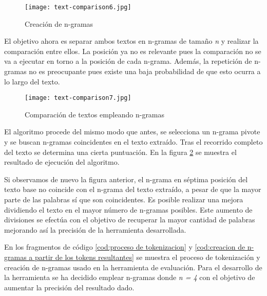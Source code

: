 \begin{figure}[tphb]
  \centering
  \texttt{[image: text-comparison6.jpg]}
  \caption{Creación de n-gramas}
  \label{img:creacion de n-gramas}
\end{figure}

El objetivo ahora es separar ambos textos en n-gramas de tamaño \emph{n} y realizar la comparación entre
ellos. La posición ya no es relevante pues la comparación no se va a ejecutar en torno a la posición de cada
n-grama. Además, la repetición de n-gramas no es preocupante pues existe una baja probabilidad de que esto
ocurra a lo largo del texto.

\begin{figure}[tphb]
  \centering
  \texttt{[image: text-comparison7.jpg]}
  \caption{Comparación de textos empleando n-gramas}
  \label{img:comparacion de textos empleando n-gramas p2}
\end{figure}

El algoritmo procede del mismo modo que antes, se selecciona un n-grama pivote y se buscan n-gramas
coincidentes en el texto extraído. Tras el recorrido completo del texto se determina una cierta puntuación.
En la figura \ref{img:comparacion de textos empleando n-gramas p2} se muestra el resultado de ejecución
del algoritmo.

Si observamos de nuevo la figura anterior, el n-grama en séptima posición del texto base no coincide con 
el n-grama del texto extraído, a pesar de que la mayor parte de las palabras sí que son coincidentes. Es 
posible realizar una mejora dividiendo el texto en el mayor número de n-gramas posibles. Este aumento de 
divisiones se efectúa con el objetivo de recuperar la mayor cantidad de palabras mejorando así la precisión 
de la herramienta desarrollada.

\begin{codefloat}
  
  \caption{Proceso de tokenización}
  \label{cod:proceso de tokenizacion}
\end{codefloat}

En los fragmentos de código \ref{cod:proceso de tokenizacion} y
\ref{cod:creacion de n-gramas a partir de los tokens resultantes} se muestra el proceso de tokenización y
creación de n-gramas usado en la herramienta de evaluación. Para el desarrollo de la herramienta se ha
decidido emplear n-gramas donde \emph{n = 4} con el objetivo de aumentar la precisión del resultado dado.

